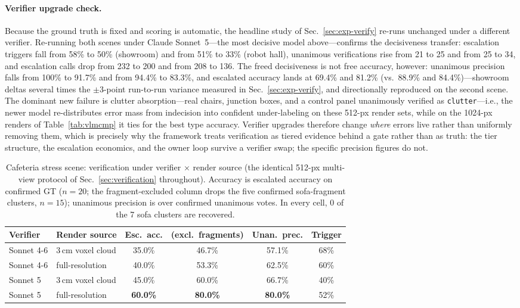 \paragraph{Verifier upgrade check.}
Because the ground truth is fixed and scoring is automatic, the headline
study of Sec.~\ref{sec:exp-verify} re-runs unchanged under a different
verifier. Re-running both scenes under Claude Sonnet~5---the most
decisive model above---confirms the decisiveness transfer: escalation
triggers fall from 58\% to 50\% (showroom) and from 51\% to 33\% (robot
hall), unanimous verifications rise from 21 to 25 and from 25 to 34, and
escalation calls drop from 232 to 200 and from 208 to 136. The freed
decisiveness is not free accuracy, however: unanimous precision falls
from 100\% to 91.7\% and from 94.4\% to 83.3\%, and escalated accuracy
lands at 69.4\% and 81.2\% (vs.\ 88.9\% and 84.4\%)---showroom deltas
several times the $\pm$3-point run-to-run variance measured in
Sec.~\ref{sec:exp-verify}, and directionally reproduced on the second
scene. The dominant new
failure is clutter absorption---real chairs, junction boxes, and a
control panel unanimously verified as \texttt{clutter}---i.e., the newer
model re-distributes error mass from indecision into confident
under-labeling on these 512-px render sets, while on the 1024-px renders
of Table~\ref{tab:vlmcmp} it ties for the best type accuracy.
Verifier upgrades therefore change \emph{where} errors live rather than
uniformly removing them, which is precisely why the framework treats
verification as tiered evidence behind a gate rather than as truth: the
tier structure, the escalation economics, and the owner loop survive a
verifier swap; the specific precision figures do not.

\begin{table}[!t]
\centering
\caption{Cafeteria stress scene: verification under verifier $\times$
render source (the identical 512-px multi-view protocol of
Sec.~\ref{sec:verification} throughout). Accuracy is escalated accuracy
on confirmed GT ($n{=}20$; the fragment-excluded column drops the five
confirmed sofa-fragment clusters, $n{=}15$); unanimous precision is over
confirmed unanimous votes. In every cell, 0 of the 7 sofa clusters are
recovered.}
\label{tab:cafe}
\small
\begin{tabular}{@{}llcccc@{}}
\toprule
Verifier & Render source & Esc.\ acc. & (excl.\ fragments) &
Unan.\ prec. & Trigger \\
\midrule
Sonnet 4-6 & 3\,cm voxel cloud & 35.0\% & 46.7\% & 57.1\% & 68\% \\
Sonnet 4-6 & full-resolution & 40.0\% & 53.3\% & 62.5\% & 60\% \\
Sonnet 5 & 3\,cm voxel cloud & 45.0\% & 60.0\% & 66.7\% & 40\% \\
Sonnet 5 & full-resolution & \textbf{60.0\%} & \textbf{80.0\%} &
\textbf{80.0\%} & 52\% \\
\bottomrule
\end{tabular}
\end{table}


